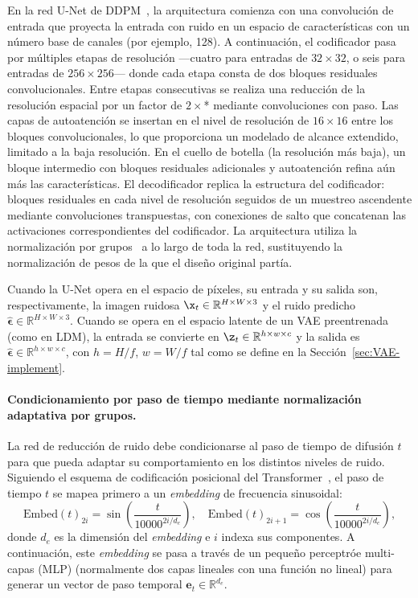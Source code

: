 \documentclass[../../book-main_es.tex]{subfiles}
\begin{document}
En la red U-Net de DDPM~\citep{ho2020denoising}, la arquitectura comienza con una convolución de entrada 
que proyecta la entrada con ruido en un espacio de características con un número base de canales 
(por ejemplo, 128). A continuación, el codificador pasa por múltiples etapas de resolución ---cuatro 
para entradas de $32 \times 32$, o seis para entradas de $256 \times 256$--- donde cada etapa consta 
de dos bloques residuales convolucionales. Entre etapas consecutivas se realiza una reducción de la resolución espacial 
por un factor de $2\times$* mediante convoluciones con paso. Las capas de autoatención se insertan en el nivel de resolución de 
$16 \times 16$ entre los bloques convolucionales, lo que 
proporciona un modelado de alcance extendido, limitado a la baja resolución. En el cuello de botella (la 
resolución más baja), un bloque intermedio con bloques residuales adicionales y autoatención refina 
aún más las características. El decodificador replica la estructura del codificador: bloques residuales en 
cada nivel de resolución seguidos de un muestreo ascendente mediante convoluciones transpuestas, con 
conexiones de salto que concatenan las activaciones correspondientes del codificador. La 
arquitectura utiliza la normalización por grupos~\citep{wu2018group} a lo largo de toda la red, 
sustituyendo la normalización de pesos de la que el diseño original partía.

Cuando la U-Net opera en el espacio de píxeles, su entrada y su salida son, respectivamente, la 
imagen ruidosa $\x_t \in \mathbb{R}^{H \times W \times 3}$ y el ruido predicho 
$\hat{\boldsymbol{\epsilon}} \in \mathbb{R}^{H \times W \times 3}$. Cuando se opera en 
el espacio latente de un VAE preentrenada (como en LDM), la entrada se convierte 
en $\z_t \in \mathbb{R}^{h \times w \times c}$ y la salida es 
$\hat{\boldsymbol{\epsilon}} \in \mathbb{R}^{h \times w \times c}$, con $h = H/f$, $w = W/f$ 
tal como se define en la Sección~\ref{sec:VAE-implement}.

\paragraph{Condicionamiento por paso de tiempo mediante normalización adaptativa por grupos.}
La red de reducción de ruido debe condicionarse al paso de tiempo de difusión $t$ para que 
pueda adaptar su comportamiento en los distintos niveles de ruido. Siguiendo el esquema de 
codificación posicional del Transformer~\citep{vaswani2017attention}, el paso de tiempo $t$ 
se mapea primero a un \textit{embedding} de frecuencia sinusoidal:
\begin{equation}
    \mathrm{Embed}(t)_{2i} = \sin\!\left(\frac{t}{10000^{2i/d_e}}\right), \quad
    \mathrm{Embed}(t)_{2i+1} = \cos\!\left(\frac{t}{10000^{2i/d_e}}\right),
\end{equation}
donde $d_e$ es la dimensión del \textit{embedding} e $i$ indexa sus componentes. A continuación, este 
\textit{embedding} se pasa a través de un pequeño perceptróe multi-capas (MLP) (normalmente dos capas 
lineales con una función no lineal) para generar un vector de paso temporal 
$\boldsymbol{e}_t \in \mathbb{R}^{d_e}$.
\end{document}
